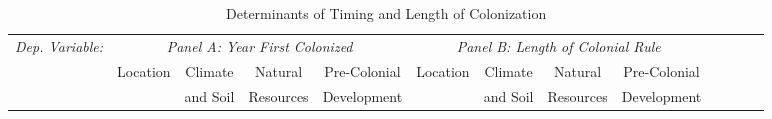 \begin{sidewaystable}[h!]
\begin{threeparttable}
\begin{center}
\begin{minipage}{\textwidth}
\small
\caption{Determinants of Timing and Length of Colonization}
\label{tab:TabB7}
\begin{tabular*}{\textwidth}{@{\extracolsep{\fill}}lcccccccccccc@{\extracolsep{\fill}}}
\hline\hline
\textit{Dep. Variable:}    &\multicolumn{4}{c}{\textit{Panel A: Year First Colonized}}
            &\multicolumn{4}{c}{\textit{Panel B: Length of Colonial Rule}}\\
            \cmidrule{2-5} \cmidrule{6-9}
            &\multicolumn{1}{c}{Location}
            &\multicolumn{1}{c}{Climate}
            &\multicolumn{1}{c}{Natural}
            &\multicolumn{1}{c}{Pre-Colonial}
            &\multicolumn{1}{c}{Location}
            &\multicolumn{1}{c}{Climate}
            &\multicolumn{1}{c}{Natural}
            &\multicolumn{1}{c}{Pre-Colonial}\\
            & & and Soil & Resources& Development && and Soil&Resources& Development \\
    
\hline


\end{tabular*}
\end{minipage}
\end{center}
\end{threeparttable}
\end{sidewaystable}
